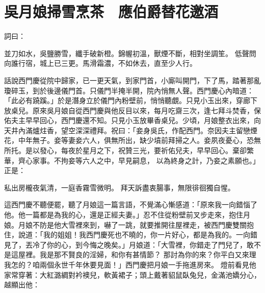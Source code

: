 %

\chapter{吳月娘掃雪烹茶　應伯爵替花邀酒}

\begin{showcontents}{}


詞曰：

並刀如水，吳鹽勝雪，纖手破新橙。錦幄初溫，獸煙不斷，相對坐調笙。
低聲問向誰行宿，城上已三更。馬滑霜濃，不如休去，直至少人行。

話說西門慶從院中歸家，已一更天氣，到家門首，小廝叫開門，下了馬，踏著那亂瓊碎玉，到於後邊儀門首。只儀門半掩半開，院內悄無人聲。西門慶心內暗道： 「此必有蹺蹊。」於是潛身立於儀門內粉壁前，悄悄聽覷。只見小玉出來，穿廊下放桌兒。原來吳月娘自從西門慶與他反目以來，每月吃齋三次，逢七拜斗焚香，保佑夫主早早回心，西門慶還不知。只見小玉放畢香桌兒。少頃，月娘整衣出來，向天井內滿爐炷香，望空深深禮拜。祝曰：「妾身吳氏，作配西門。奈因夫主留戀煙花，中年無子。妾等妻妾六人，俱無所出，缺少墳前拜掃之人。妾夙夜憂心，恐無所托。是以發心，每夜於星月之下，祝贊三光，要祈佑兒夫，早早回心。棄卻繁華，齊心家事。不拘妾等六人之中，早見嗣息，
以為終身之計，乃妾之素願也。」正是：

私出房櫳夜氣清，一庭香霧雪微明。
拜天訴盡衷腸事，無限徘徊獨自惺。

這西門慶不聽便罷，聽了月娘這一篇言語，不覺滿心慚感道：「原來我一向錯惱了他。他一篇都是為我的心，還是正經夫妻。」忍不住從粉壁前叉步走來，抱住月娘。月娘不防是他大雪裡來到，嚇了一跳，就要推開往屋裡走，被西門慶雙關抱住，說道：「我的姐姐！我西門慶死也不曉的，你一片好心，都是為我的。一向錯見了，丟冷了你的心，到今悔之晚矣。」月娘道：「大雪裡，你錯走了門兒了，敢不是這屋裡。我是那不賢良的淫婦，和你有甚情節？
那討為你的來？你平白又來理我怎的？咱兩個永世千年休要見面！」西門慶把月娘一手拖進房來。
燈前看見他家常穿著：大紅潞綢對衿襖兒，軟黃裙子；頭上戴著貂鼠臥兔兒，金滿池嬌分心，
越顯出他：


\end{showcontents}

